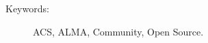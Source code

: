 \documentclass[10pt]{article}
\title{
\center{
	\textbf{ACS Community Branch}
	}
\author{Universidad Técnica Federico Santa María \\
	Computer Systems Research Group \\ \\ \\
	Tomás Staig \\ \url{tstaig@csrg.inf.utfsm.cl} \\
	Jonathan Antognini \\ \url{jantogni@csrg.inf.utfsm.cl} \\
	}
\date{Valparaíso, \today}
}
\newenvironment{keywords}{\begin{description}\item[Keywords:]}{\end{description}}
\begin{document}
\maketitle

\vspace{0.5cm}

\begin{center}
	\begin{abstract}
		
	\end{abstract}
\end{center}

\vspace{0.4cm}

\begin{center}
\begin{keywords}
ACS, ALMA, Community, Open Source.
\end{keywords}
\end{center}

\vspace{1cm}

\thispagestyle{empty}

\newpage
\tableofcontents

\newpage


\newpage


\newpage


\newpage


\newpage


\newpage

\thispagestyle{empty}

%
%
\end{document}
